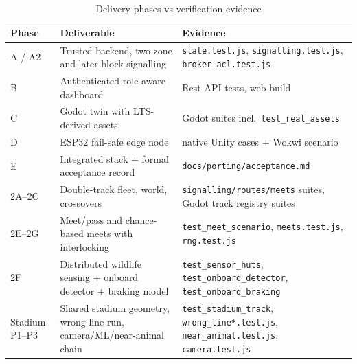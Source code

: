 \begin{longtable}{>{\raggedright}p{1.3cm} >{\raggedright\arraybackslash}p{6.2cm} >{\raggedright\arraybackslash}p{5.6cm}}
\caption{Delivery phases vs verification evidence}\label{tab:phasemap}\\
\toprule
\textbf{Phase} & \textbf{Deliverable} & \textbf{Evidence} \\
\midrule
A / A2 & Trusted backend, two-zone and later block signalling & \texttt{state.test.js}, \texttt{signalling.test.js}, \texttt{broker\_acl.test.js} \\
B & Authenticated role-aware dashboard & Rest API tests, web build \\
C & Godot twin with LTS-derived assets & 42 Godot suites incl.\ \texttt{test\_real\_assets} \\
D & ESP32 fail-safe edge node & 16 native Unity cases + Wokwi scenario \\
E & Integrated stack + formal acceptance record & \texttt{docs/porting/acceptance.md} \\
2A--2C & Double-track fleet, world, crossovers & \texttt{signalling/routes/meets} suites, Godot track registry suites \\
2E--2G & Meet/pass and chance-based meets with interlocking & \texttt{test\_meet\_scenario}, \texttt{meets.test.js}, \texttt{rng.test.js} \\
2F & Distributed wildlife sensing + onboard detector + braking model & \texttt{test\_sensor\_huts}, \texttt{test\_onboard\_detector}, \texttt{test\_onboard\_braking} \\
Stadium P1--P3 & Shared stadium geometry, wrong-line run, camera/ML/near-animal chain & \texttt{test\_stadium\_track}, \texttt{wrong\_line*.test.js}, \texttt{near\_animal.test.js}, \texttt{camera.test.js} \\
\bottomrule
\end{longtable}
